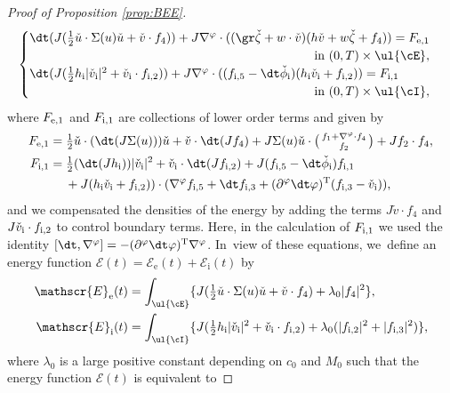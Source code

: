 \begin{proof}[Proof of Proposition \ref{prop:BEE}]
\[\begin{cases}
\dt(J(\frac12\check{u}\cdot\Sigma(u)\check{u}+\check{v}\cdot f_4))
+ J\nabla^\varphi\cdot((\gr\check{\zeta}+w\cdot\check{v})(h\check{v}+w\check{\zeta}+f_4)) = F_{{\rm e},1} \\
\hfill \text{in } (0,T)\times\ul{\cE}, \\
\dt(J(\frac12h_\mathrm{i}|\check{v}_\mathrm{i}|^2 + \check{v}_\mathrm{i}\cdot f_{{\rm i},2}))
+ J\nabla^\varphi\cdot((f_{{\rm i},5}-\dt\check{\phi}_\mathrm{i})(h_\mathrm{i}\check{v}_\mathrm{i}+f_{{\rm i},2})) = F_{{\rm i},1} \\
\hfill \text{in } (0,T)\times\ul{\cI},
\end{cases}
\]
where $F_{{\rm e},1}$ and $F_{{\rm i},1}$ are collections of lower order terms and given by
\begin{align*}
F_{{\rm e},1}
&= \tfrac12\check{u}\cdot(\dt(J\Sigma(u)))\check{u} + \check{v}\cdot\dt(Jf_4)
+ J\Sigma(u)\check{u}\cdot\bigl(\begin{smallmatrix} f_1+\nabla^\varphi\cdot f_4 \\ f_2 \end{smallmatrix} \bigr) + Jf_2\cdot f_4, \\
F_{{\rm i},1}
&= \tfrac12(\dt(Jh_\mathrm{i}))|\check{v}_\mathrm{i}|^2 + \check{v}_\mathrm{i}\cdot\dt(Jf_{{\rm i},2})
+ J(f_{{\rm i},5}-\dt\check{\phi}_\mathrm{i})f_{{\rm i},1} \\
&\quad\;
+ J(h_\mathrm{i}\check{v}_\mathrm{i}+f_{{\rm i},2}))\cdot(\nabla^\varphi f_{{\rm i},5}+\dt f_{{\rm i},3}
+ (\partial^\varphi\dt\varphi)^\mathrm{T}(f_{{\rm i},3}-\check{v}_\mathrm{i})),
\end{align*}
and we compensated the densities of the energy by adding the terms $J\check{v}\cdot f_4$ and $J\check{v}_\mathrm{i}\cdot f_{{\rm i},2}$ to control boundary terms.
Here, in the calculation of $F_{{\rm i},1}$ we used the identity $[\dt,\nabla^\varphi]=-(\partial^\varphi\dt\varphi)^\mathrm{T}\nabla^\varphi$. In~view of these equations, we~define an energy function $\mathscr{E}(t)=\mathscr{E}_\mathrm{e}(t)+\mathscr{E}_\mathrm{i}(t)$ by
\begin{align*}
\mathscr{E}_\mathrm{e}(t)
&= \int_{\ul{\cE}}\{ J(\tfrac12\check{u}\cdot\Sigma(u)\check{u}+\check{v}\cdot f_4) + \lambda_0|f_4|^2 \}, \\
\mathscr{E}_\mathrm{i}(t)
&= \int_{\ul{\cI}}\{ J(\tfrac12h_\mathrm{i}|\check{v}_\mathrm{i}|^2 + \check{v}_\mathrm{i}\cdot f_{{\rm i},2}) + \lambda_0(|f_{{\rm i},2}|^2+|f_{{\rm i},3}|^2) \},
\end{align*}
where $\lambda_0$ is a large positive constant depending on $c_0$ and $M_0$ such that the energy function $\mathscr{E}(t)$ is equivalent to

\end{proof}
